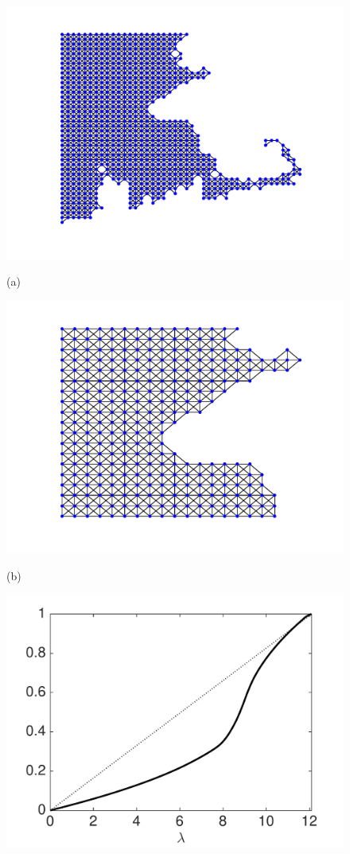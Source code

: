 \documentclass[journal, 10pt]{IEEEtran}
\begin{document}
\begin{figure}[tb] 
\begin{minipage}[m]{0.24\linewidth}
\centerline{\includegraphics[width=.9\linewidth]{fig_temp_graph_structure}}
\vspace{-.2in}
\centerline{\small{(a)}}
\end{minipage}
\begin{minipage}[m]{0.24\linewidth}
\centerline{\includegraphics[width=.9\linewidth]{fig_temp_structure_bos}}
\vspace{-.2in}
\centerline{\small{(b)}}
\end{minipage} %
\begin{minipage}[m]{0.24\linewidth}
\centerline{\includegraphics[width=.9\linewidth]{fig_temp_cdf}}

\end{minipage}
\end{figure}
\end{document}
